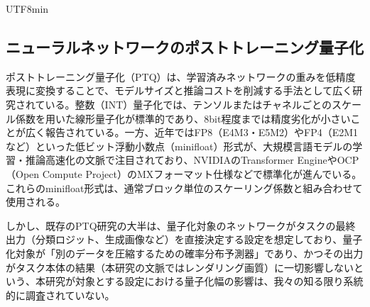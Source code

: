 \documentclass{ieeeaccess}
\begin{document}
\begin{CJK}{UTF8}{min}
\subsection{ニューラルネットワークのポストトレーニング量子化}
ポストトレーニング量子化（PTQ）は、学習済みネットワークの重みを低精度表現に変換することで、モデルサイズと推論コストを削減する手法として広く研究されている。整数（INT）量子化では、テンソルまたはチャネルごとのスケール係数を用いた線形量子化が標準的であり、8bit程度までは精度劣化が小さいことが広く報告されている。一方、近年ではFP8（E4M3・E5M2）やFP4（E2M1など）といった低ビット浮動小数点（minifloat）形式が、大規模言語モデルの学習・推論高速化の文脈で注目されており、NVIDIAのTransformer EngineやOCP（Open Compute Project）のMXフォーマット仕様\cite{ocp_mx}などで標準化が進んでいる。これらのminifloat形式は、通常ブロック単位のスケーリング係数と組み合わせて使用される。

しかし、既存のPTQ研究の大半は、量子化対象のネットワークがタスクの最終出力（分類ロジット、生成画像など）を直接決定する設定を想定しており、量子化対象が「別のデータを圧縮するための確率分布予測器」であり、かつその出力がタスク本体の結果（本研究の文脈ではレンダリング画質）に一切影響しないという、本研究が対象とする設定における量子化幅の影響は、我々の知る限り系統的に調査されていない。
\end{CJK}
\end{document}
